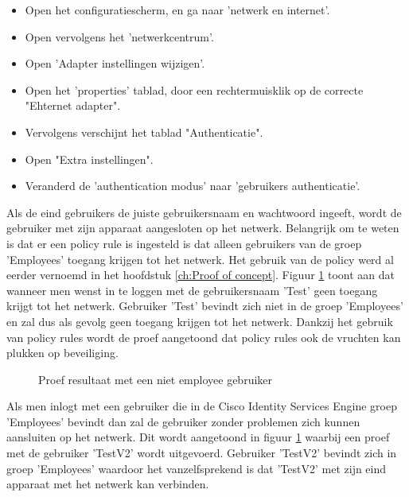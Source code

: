\begin{itemize}
	\item Open het configuratiescherm, en ga naar 'netwerk en internet'.
	\item Open vervolgens het 'netwerkcentrum'.
	\item Open 'Adapter instellingen wijzigen'.
	\item Open het 'properties' tablad, door een rechtermuisklik op de correcte "Ehternet adapter".
	\item Vervolgens verschijnt het tablad "Authenticatie".
	\item Open "Extra instellingen".
	\item Veranderd de 'authentication modus' naar 'gebruikers authenticatie'.
\end{itemize}

Als de eind gebruikers de juiste gebruikersnaam en wachtwoord ingeeft, wordt de gebruiker met zijn apparaat aangesloten op het netwerk. Belangrijk om te weten is dat er een policy rule is ingesteld is dat alleen gebruikers van de groep 'Employees' toegang krijgen tot het netwerk. Het gebruik van de policy werd al eerder vernoemd in het hoofdstuk \ref{ch:Proof of concept}.
Figuur \ref{fig:Test_gebruiker} toont aan dat wanneer men wenst in te loggen met de gebruikersnaam 'Test' geen toegang krijgt tot het netwerk. Gebruiker 'Test' bevindt zich niet in de groep 'Employees' en zal dus als gevolg geen toegang krijgen tot het netwerk. Dankzij het gebruik van policy rules wordt de proef aangetoond dat policy rules ook de vruchten kan plukken op beveiliging.

\begin{figure}[H]
	\centering
	\qquad
	\newline
	\caption{Proef resultaat met een niet employee gebruiker}%
	\label{fig:Test_gebruiker}%
\end{figure}
	
Als men inlogt met een gebruiker die in de Cisco Identity Services Engine groep 'Employees' bevindt dan zal de gebruiker zonder problemen zich kunnen aansluiten op het netwerk. Dit wordt aangetoond in figuur \ref{fig:Test_gebruiker} waarbij een proef met de gebruiker 'TestV2' wordt uitgevoerd. Gebruiker 'TestV2' bevindt zich in groep 'Employees' waardoor het vanzelfsprekend is dat 'TestV2' met zijn eind apparaat met het netwerk kan verbinden. 

